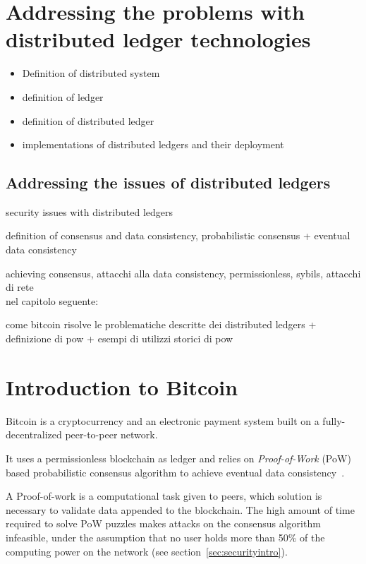 \documentclass[12pt, letterpaper, twoside]{article}
\title{}
\author{}
\begin{document}
\maketitle

\section{Addressing the problems with distributed ledger technologies}\label{intro}
\begin{itemize}
	\item Definition of distributed system

	\item definition of ledger

	\item definition of distributed ledger

	\item implementations of distributed ledgers and their deployment
\end{itemize}

\subsection{Addressing the issues of distributed ledgers}\label{ledgerproblems}
security issues with distributed ledgers

definition of consensus and data consistency, probabilistic consensus + eventual data consistency

achieving consensus, attacchi alla data consistency, permissionless, sybils, attacchi di rete\\

nel capitolo seguente:

come bitcoin risolve le problematiche descritte dei distributed ledgers + definizione di pow + esempi di utilizzi storici di pow


\section{Introduction to Bitcoin}\label{sec:introbtc}
Bitcoin is a cryptocurrency and an electronic payment system built on a fully-decentralized peer-to-peer network.

It uses a permissionless blockchain as ledger and relies on \emph{Proof-of-Work} (PoW) based probabilistic consensus algorithm to achieve eventual data consistency~\cite{nakamoto}.

A Proof-of-work is a computational task given to peers, which solution is necessary to validate data appended to the blockchain. The high amount of time required to solve PoW puzzles makes attacks on the consensus algorithm infeasible, under the assumption that no user holds more than 50\% of the computing power on the network (see section~\ref{sec:securityintro}).
\end{document}
